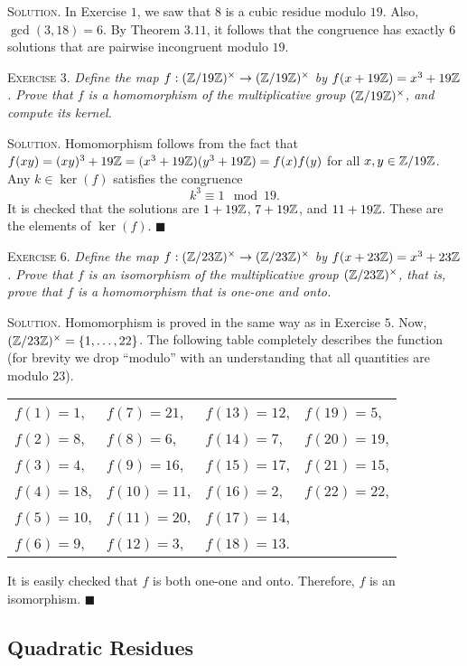 \documentclass[11pt, leqno]{article}
\newcommand{\done}{\ensuremath{\blacksquare}}
\begin{document}
\textsc{Solution}. In Exercise $1$, we saw that $8$ is a cubic residue modulo $19$. Also, $\gcd(3,18) = 6$. By Theorem $3.11$, it follows that the congruence has exactly $6$ solutions that are pairwise incongruent modulo $19$.

\textsc{Exercise 3}. \emph{Define the map $f:(\mathbb{Z}/19\mathbb{Z})^{\times} \to (\mathbb{Z}/19\mathbb{Z})^{\times}$ by $f(x+19\mathbb{Z}) = x^3+19\mathbb{Z}$. Prove that $f$ is a homomorphism of the multiplicative group $(\mathbb{Z}/19\mathbb{Z})^{\times}$, and compute its kernel.}

\textsc{Solution}. Homomorphism follows from the fact that $f(xy) = (xy)^3 + 19\mathbb{Z} = (x^3+19\mathbb{Z})(y^3+19\mathbb{Z}) = f(x)f(y)$ for all $x,y \in \mathbb{Z}/19\mathbb{Z}$. Any $k\in \ker(f)$ satisfies the congruence
\begin{displaymath}
k^3 \equiv 1 \mod 19.
\end{displaymath}
It is checked that the solutions are $1+19\mathbb{Z}$, $7+19\mathbb{Z}$, and $11+19\mathbb{Z}$. These are the elements of $\ker(f)$. \done

\textsc{Exercise 6}. \emph{Define the map $f: (\mathbb{Z}/23\mathbb{Z})^{\times} \to (\mathbb{Z}/23\mathbb{Z})^{\times}$ by $f(x+ 23\mathbb{Z}) = x^3 + 23\mathbb{Z}$. Prove that $f$ is an isomorphism of the multiplicative group $(\mathbb{Z}/23\mathbb{Z})^{\times}$, that is, prove that $f$ is a homomorphism that is one-one and onto.}

\textsc{Solution}. Homomorphism is proved in the same way as in Exercise $5$. Now, $(\mathbb{Z}/23\mathbb{Z})^{\times} = \{1, \ldots, 22\}$. The following table completely describes the function (for brevity we drop ``modulo'' with an understanding that all quantities are modulo $23$).
\begin{longtable}{p{6em} p{6em} p{6em} p{6em}}
  $f(1) = 1$, & $f(7) = 21$, & $f(13) = 12$, & $f(19) = 5$,\\
  $f(2) = 8$, & $f(8) = 6$, & $f(14) = 7$, & $f(20) = 19$,\\
  $f(3) = 4$, & $f(9) = 16$, & $f(15) = 17$, & $f(21) = 15$,\\
  $f(4) = 18$, & $f(10) = 11$, & $f(16) = 2$, & $f(22) = 22$,\\
  $f(5) = 10$, & $f(11) = 20$, & $f(17) = 14$, & \\
  $f(6) = 9$, & $f(12) = 3$, & $f(18) = 13$. & 
\end{longtable}
\reduce
It is easily checked that $f$ is both one-one and onto. Therefore, $f$ is an isomorphism. \done

\subsection{Quadratic Residues}
\end{document}
